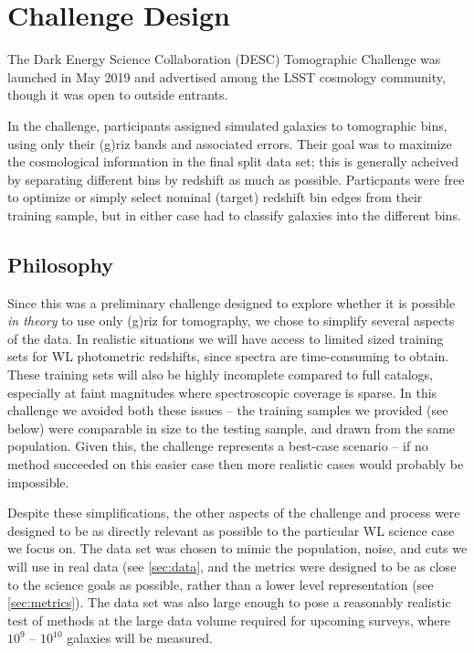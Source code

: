 \documentclass[twocolumn,twocolappendix]{aastex63}
\begin{document}
\section{Challenge Design}

The Dark Energy Science Collaboration (DESC) Tomographic Challenge was launched in May 2019 and 
advertised among the LSST cosmology community, though it was open to outside entrants.

In the challenge, participants assigned simulated galaxies to tomographic bins,
using only their (g)riz bands and associated errors.  Their goal was to maximize the cosmological
information in the final split data set; this is generally acheived by separating different bins by 
redshift as much as possible.  Particpants were free to optimize or simply select nominal (target) 
redshift bin edges from their training sample, but in either case had to classify galaxies into the 
different bins.

\subsection{Philosophy}

Since this was a preliminary challenge designed to explore whether it is possible \emph{in theory}
to use only (g)riz for tomography, we chose to simplify several aspects of the data.  In realistic 
situations we will have access to limited sized training sets for WL photometric redshifts, since 
spectra are time-consuming to obtain.  These training sets will also be highly incomplete compared
to full catalogs, especially at faint magnitudes where spectroscopic coverage is sparse.  In this
challenge we avoided both these issues -- the training samples we provided (see below) were comparable
in size to the testing sample, and drawn from the same population.  Given this, the challenge
represents a best-case scenario -- if no method succeeded on this easier case then more realistic
cases would probably be impossible.

Despite these simplifications, the other aspects of the challenge and process were designed to be
as directly relevant as possible to the particular WL science case we focus on.  The data set
was chosen to mimic the population, noise, and cuts we will use in real data (see \autoref{sec:data}, 
and the metrics were designed to be as close to the science goals as possible, rather than a lower
level representation (see \autoref{sec:metrics}). The data set was also large enough to pose a 
reasonably realistic test of methods at the large data volume required for upcoming surveys, where
$10^9$ -- $10^{10}$ galaxies will be measured.
\end{document}
